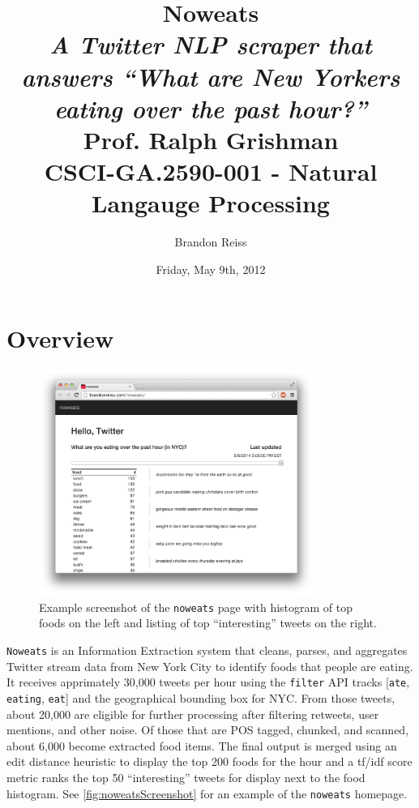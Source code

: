 \documentclass[letterpaper]{article}%
\date{Friday, May 9th, 2012}
\title{Noweats \\
  {\small \sl A Twitter NLP scraper that answers ``What are New Yorkers eating
  over the past hour?''} \\
  \vspace{2em}
  {\small Prof. Ralph Grishman \\ CSCI-GA.2590-001 - Natural Langauge
  Processing}
}
\author{Brandon Reiss}
\begin{document}
\maketitle

\providecommand{\noweats}{\texttt{noweats}\xspace}
\providecommand{\Noweats}{\texttt{Noweats}\xspace}
\providecommand{\nltk}{\texttt{nltk}\xspace}

\section{Overview}%

\begin{figure}[th!]
  \centering
  \includegraphics[width=0.8\textwidth]{noweats}
  \caption{Example screenshot of the \noweats page with histogram of top foods
  on the left and listing of top ``interesting'' tweets on the right.}
  \label{fig:noweatsScreenshot}
\end{figure}

\Noweats is an Information Extraction system that cleans, parses, and
aggregates Twitter stream data from New York City to identify foods that people
are eating. It receives apprimately 30,000 tweets per hour using the
\texttt{filter} API tracks [\texttt{ate}, \texttt{eating}, \texttt{eat}] and
the geographical bounding box for NYC. From those tweets, about 20,000 are
eligible for further processing after filtering retweets, user mentions, and
other noise. Of those that are POS tagged, chunked, and scanned, about 6,000
become extracted food items. The final output is merged using an edit distance
heuristic to display the top 200 foods for the hour and a tf/idf score metric
ranks the top 50 ``interesting'' tweets for display next to the food histogram.
See \autoref{fig:noweatsScreenshot} for an example of the \noweats homepage.
\end{document}
